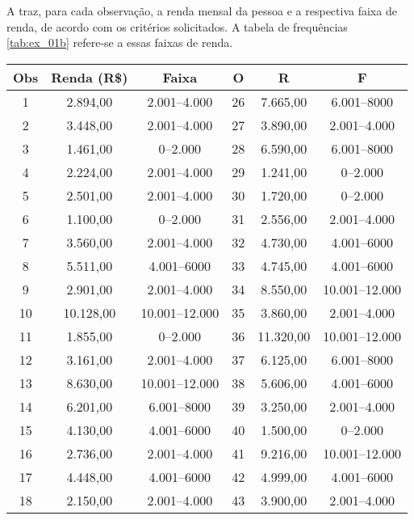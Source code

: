 \begin{resolucao}
A  traz, para cada observação, a renda mensal da
pessoa e a respectiva faixa de renda, de acordo com os critérios
solicitados. A tabela de frequências \ref{tab:ex_01b} refere-se a essas
faixas de renda.
\begin{table}[H]
    \centering
    \begin{tabular}{cccccc}
        \toprule
        Obs & Renda (R\$) & Faixa          & O  & R         & F \\
        \midrule
        1   & 2.894,00    & 2.001--4.000   & 26 & 7.665,00  & 6.001--8000    \\
        2   & 3.448,00    & 2.001--4.000   & 27 & 3.890,00  & 2.001--4.000   \\
        3   & 1.461,00    & 0--2.000       & 28 & 6.590,00  & 6.001--8000    \\
        4   & 2.224,00    & 2.001--4.000   & 29 & 1.241,00  & 0--2.000       \\
        5   & 2.501,00    & 2.001--4.000   & 30 & 1.720,00  & 0--2.000       \\
        6   & 1.100,00    & 0--2.000       & 31 & 2.556,00  & 2.001--4.000   \\
        7   & 3.560,00    & 2.001--4.000   & 32 & 4.730,00  & 4.001--6000    \\
        8   & 5.511,00    & 4.001--6000    & 33 & 4.745,00  & 4.001--6000    \\
        9   & 2.901,00    & 2.001--4.000   & 34 & 8.550,00  & 10.001--12.000 \\
        10  & 10.128,00   & 10.001--12.000 & 35 & 3.860,00  & 2.001--4.000   \\
        11  & 1.855,00    & 0--2.000       & 36 & 11.320,00 & 10.001--12.000 \\
        12  & 3.161,00    & 2.001--4.000   & 37 & 6.125,00  & 6.001--8000    \\
        13  & 8.630,00    & 10.001--12.000 & 38 & 5.606,00  & 4.001--6000    \\
        14  & 6.201,00    & 6.001--8000    & 39 & 3.250,00  & 2.001--4.000   \\
        15  & 4.130,00    & 4.001--6000    & 40 & 1.500,00  & 0--2.000       \\
        16  & 2.736,00    & 2.001--4.000   & 41 & 9.216,00  & 10.001--12.000 \\
        17  & 4.448,00    & 4.001--6000    & 42 & 4.999,00  & 4.001--6000    \\
        18  & 2.150,00    & 2.001--4.000   & 43 & 3.900,00  & 2.001--4.000   \\

\end{tabular}
\end{table}
\end{resolucao}

